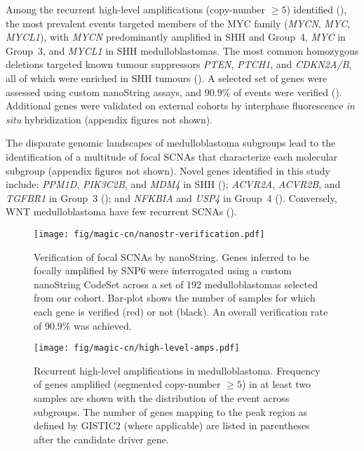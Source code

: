 Among the recurrent high-level amplifications (copy-number $\geq 5$) identified (), the most prevalent events targeted members of the MYC family (\emph{MYCN}, \emph{MYC}, \emph{MYCL1}), with \emph{MYCN} predominantly amplified in SHH and Group~4, \emph{MYC} in Group~3, and \emph{MYCL1} in SHH medulloblastomas.
The most common homozygous deletions targeted known tumour suppressors \emph{PTEN}, \emph{PTCH1}, and \emph{CDKN2A/B}, all of which were enriched in SHH tumours (). A selected set of genes were assessed using custom nanoString assays, and 90.9\% of events were verified (). Additional genes were validated on external cohorts by interphase fluorescence \emph{in situ} hybridization (appendix figures not shown).

The disparate genomic landscapes of medulloblastoma subgroups lead to the identification of a multitude of focal SCNAs that characterize each molecular subgroup (appendix figures not shown). Novel genes identified in this study include: \emph{PPM1D}, \emph{PIK3C2B}, and \emph{MDM4} in SHH (); \emph{ACVR2A}, \emph{ACVR2B}, and \emph{TGFBR1} in Group~3 (); and \emph{NFKBIA} and \emph{USP4} in Group~4 (). Conversely, WNT medulloblastoma have few recurrent SCNAs (). 

\begin{SCfigure}[5][b]
	\centering
	\texttt{[image: fig/magic-cn/nanostr-verification.pdf]}
	\caption[Verification of focal SCNAs by nanoString]
	{
	Verification of focal SCNAs by nanoString.
	Genes inferred to be focally amplified by SNP6 were interrogated using a custom nanoString CodeSet across a set of 192 medulloblastomas selected from our cohort. Bar-plot shows the number of samples for which each gene is verified (red) or not (black). An overall verification rate of 90.9\% was achieved.
	}
	\label{fig:nanostr-verification}
\end{SCfigure}

\clearpage

\begin{SCfigure}[5]
	\centering
	\texttt{[image: fig/magic-cn/high-level-amps.pdf]}
	\caption[Recurrent high-level amplifications in medulloblastoma]
	{
	Recurrent high-level amplifications in medulloblastoma.
	Frequency of genes amplified (segmented copy-number $\geq 5$) in at least two samples are shown with the distribution of the event across subgroups. The number of genes mapping to the peak region as defined by GISTIC2 (where applicable) are listed in parentheses after the candidate driver gene.
	}
	\label{fig:high-level-amps}
\end{SCfigure}


